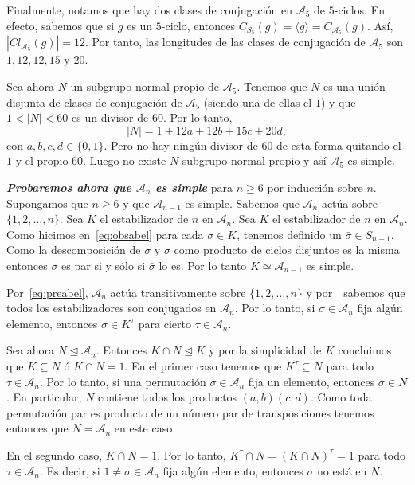 \documentclass[12pt]{article}
\begin{document}
Finalmente, notamos que hay dos clases de conjugación en $\mathcal{A}_{5}$ de $5$-ciclos. En efecto, sabemos que si $g$ es un $5$-ciclo, entonces $C_{S_{5}}(g) = \langle g \rangle = C_{\mathcal{A}_{5}}(g)$. Así, $|Cl_{\mathcal{A}_{5}}(g)| = 12$. Por tanto, las longitudes de las clases de conjugación de $\mathcal{A}_{5}$ son $1,12,12,15$ y $20$.

Sea ahora $N$ un subgrupo normal propio de $\mathcal{A}_{5}$. Tenemos que $N$ es una unión disjunta de clases de conjugación de $\mathcal{A}_{5}$ (siendo una de ellas el $1$) y que $1 < |N| < 60$ es un divisor de $60$. Por lo tanto, $$|N| = 1 + 12a + 12b + 15c + 20d,$$ con $a,b,c,d \in \lbrace 0, 1 \rbrace$. Pero no hay ningún divisor de $60$ de esta forma quitando el $1$ y el propio $60$. Luego no existe $N$ subgrupo normal propio y así $\mathcal{A}_{5}$ es simple.

\textbf{\textit{Probaremos ahora que $\mathcal{A}_{n}$ es simple}} para $n \geq 6$ por inducción sobre $n$. Supongamos que $n \geq 6$ y que $\mathcal{A}_{n-1}$ es simple. Sabemos que $\mathcal{A}_{n}$ actúa sobre $\lbrace 1,2, \ldots, n \rbrace$. Sea $K$ el estabilizador de $n$ en $\mathcal{A}_{n}$. Sea $K$ el estabilizador de $n$ en $\mathcal{A}_{n}$. Como hicimos en~\ref{eq:obsabel} para cada $\sigma \in K$, tenemos definido un $\bar{\sigma} \in S_{n-1}$. Como la descomposición de $\sigma$ y $\bar{\sigma}$ como producto de ciclos disjuntos es la misma entonces $\sigma$ es par si y sólo si $\bar{\sigma}$ lo es. Por lo tanto $K \simeq \mathcal{A}_{n-1}$ es simple.

Por~\ref{eq:preabel}, $\mathcal{A}_{n}$ actúa transitivamente sobre $\lbrace 1, 2, \ldots, n \rbrace$ y por~~sabemos que todos los estabilizadores son conjugados en $\mathcal{A}_{n}$. Por lo tanto, si $\sigma \in \mathcal{A}_{n}$ fija algún elemento, entonces $\sigma \in K^{\tau}$ para cierto $\tau \in \mathcal{A}_{n}$.

Sea ahora $N\unlhd \mathcal{A}_{n}$. Entonces $K \cap N \unlhd K$ y por la simplicidad de $K$ concluimos que $K \subseteq N$ ó $K \cap N = 1$. En el primer caso tenemos que $K^{\tau} \subseteq N$ para todo $\tau \in \mathcal{A}_{n}$. Por lo tanto, si una permutación $\sigma \in \mathcal{A}_{n}$ fija un elemento, entonces $\sigma \in N$. En particular, $N$ contiene todos los productos $(a,b)(c,d)$. Como toda permutación par es producto de un número par de transposiciones tenemos entonces que $N = \mathcal{A}_{n}$ en este caso.

En el segundo caso, $K \cap N = 1$. Por lo tanto, $K^{\tau} \cap N = (K \cap N)^{\tau} = 1$ para todo $\tau \in \mathcal{A}_{n}$. Es decir, si $1 \neq \sigma \in \mathcal{A}_{n}$ fija algún elemento, entonces $\sigma$ no está en $N$. 
\end{document}

